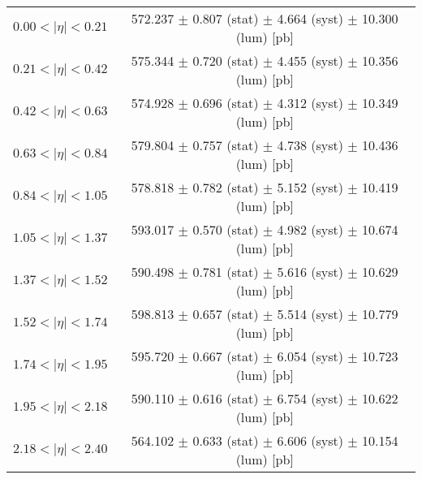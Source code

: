 \begin{tabular}{lc}
\hline
$0.00 < |\eta| <0.21$          & 572.237 $\pm$ 0.807 (stat) $\pm$ 4.664 (syst) $\pm$ 10.300 (lum) [pb]  \\
$0.21 < |\eta| <0.42$          & 575.344 $\pm$ 0.720 (stat) $\pm$ 4.455 (syst) $\pm$ 10.356 (lum) [pb]  \\
$0.42 < |\eta| <0.63$          & 574.928 $\pm$ 0.696 (stat) $\pm$ 4.312 (syst) $\pm$ 10.349 (lum) [pb]  \\
$0.63 < |\eta| <0.84$          & 579.804 $\pm$ 0.757 (stat) $\pm$ 4.738 (syst) $\pm$ 10.436 (lum) [pb]  \\
$0.84 < |\eta| <1.05$          & 578.818 $\pm$ 0.782 (stat) $\pm$ 5.152 (syst) $\pm$ 10.419 (lum) [pb]  \\
$1.05 < |\eta| <1.37$          & 593.017 $\pm$ 0.570 (stat) $\pm$ 4.982 (syst) $\pm$ 10.674 (lum) [pb]  \\
$1.37 < |\eta| <1.52$          & 590.498 $\pm$ 0.781 (stat) $\pm$ 5.616 (syst) $\pm$ 10.629 (lum) [pb]  \\
$1.52 < |\eta| <1.74$          & 598.813 $\pm$ 0.657 (stat) $\pm$ 5.514 (syst) $\pm$ 10.779 (lum) [pb]  \\
$1.74 < |\eta| <1.95$          & 595.720 $\pm$ 0.667 (stat) $\pm$ 6.054 (syst) $\pm$ 10.723 (lum) [pb]  \\
$1.95 < |\eta| <2.18$          & 590.110 $\pm$ 0.616 (stat) $\pm$ 6.754 (syst) $\pm$ 10.622 (lum) [pb]  \\
$2.18 < |\eta| <2.40$          & 564.102 $\pm$ 0.633 (stat) $\pm$ 6.606 (syst) $\pm$ 10.154 (lum) [pb]  \\
\hline
\end{tabular}
